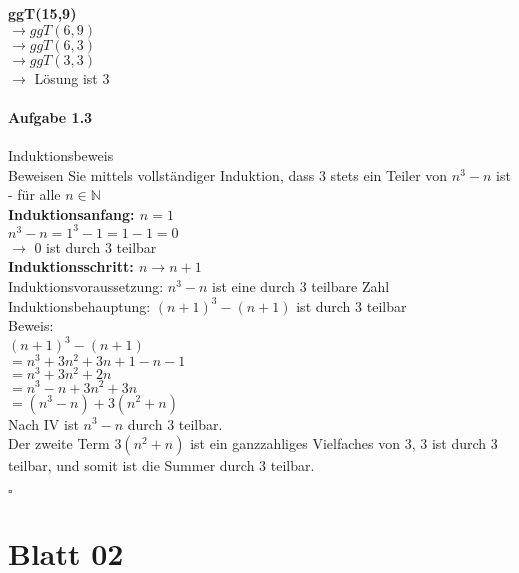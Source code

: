 \documentclass[paper=a4, fontsize=11pt]{scrartcl}
\numberwithin{equation}{section}
\numberwithin{figure}{section}
\numberwithin{table}{section}
\begin{document}
\textbf{ggT(15,9)} \\
$\longrightarrow ggT(6,9)$ \\
$\longrightarrow ggT(6,3)$ \\
$\longrightarrow ggT(3,3)$ \\
$\longrightarrow$ Lösung ist 3\\


\paragraph{Aufgabe 1.3} Induktionsbeweis \\
Beweisen Sie mittels vollständiger Induktion, dass $3$ stets ein Teiler von $n^{3}-n$ ist - für alle $n \in \mathbb{N}$ \\

\textbf{Induktionsanfang: $n=1$}\\
$n^{3}-n = 1^{3}-1 = 1-1 = 0$ \\
$\longrightarrow$ $0$ ist durch $3$ teilbar \\

\textbf{Induktionsschritt: $n \longrightarrow n+1$}\\
Induktionsvoraussetzung: $n^{3}-n$ ist eine durch $3$ teilbare Zahl\\
Induktionsbehauptung: $(n+1)^{3}-(n+1)$ ist durch $3$ teilbar\\
Beweis:\\
$(n+1)^{3}-(n+1)$\\
$= n^{3}+3n^{2}+3n+1-n-1$\\
$= n^{3}+3n^{2}+2n$\\
$= n^{3}-n+3n^{2}+3n$\\
$= (n^{3}-n)+3(n^{2}+n)$\\
Nach IV ist $n^{3}-n$ durch $3$ teilbar. \\
Der zweite Term $3(n^{2}+n)$ ist ein ganzzahliges Vielfaches von $3$, $3$ ist durch $3$ teilbar, und somit ist die Summer durch 3 teilbar.\\ 
\begin{flushright}
\hfill $\square$
\end{flushright}



\newpage

\section{Blatt 02}
\end{document}
